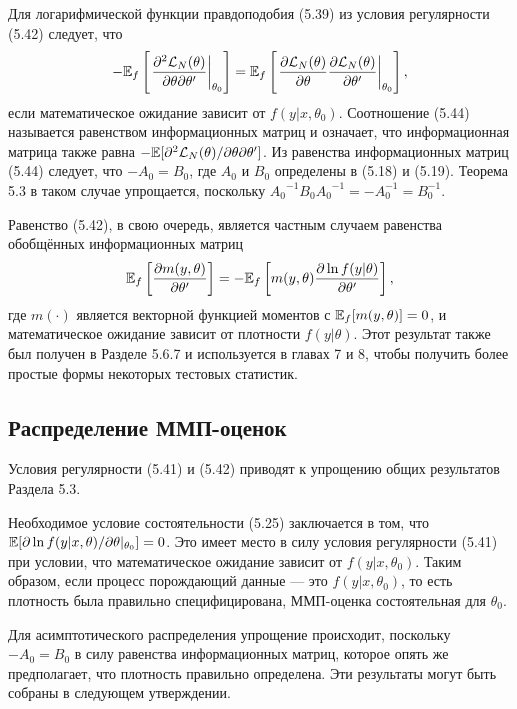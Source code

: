 Для логарифмической функции правдоподобия (5.39) из условия регулярности (5.42) следует, что
\begin{equation}
-\mathbb{E}_{f} \left[ \left. \frac{\partial^2 \mathcal{L}_{N}(\theta)}{\partial \theta \partial \theta'} \right|_{\theta_0} \right] = \mathbb{E}_{f} \left[ \left. \frac{\partial \mathcal{L}_{N}(\theta)}{\partial \theta} \frac{\partial \mathcal{L}_{N}(\theta)}{\partial \theta'} \right|_{\theta_0} \right],
\end{equation}
если математическое ожидание зависит от $f(y|x,\theta_0)$. Соотношение (5.44) называется равенством информационных матриц и означает, что информационная матрица также равна $-\mathbb{E} [\partial^2 \mathcal{L}_{N}(\theta) / \partial \theta \partial \theta']$. Из равенства информационных матриц (5.44) следует, что $-A_0=B_0$, где $A_0$ и $B_0$ определены в (5.18) и (5.19). Теорема 5.3 в таком случае упрощается, поскольку ${A_0}^{-1}B_0{A_0}^{-1}=-A_0^{-1}=B_0^{-1}$. 

Равенство (5.42), в свою очередь, является частным случаем равенства обобщённых информационных матриц
\begin{equation}
\mathbb{E}_{f} \left[ \frac{\partial m(y,\theta)}{\partial \theta'} \right] = -\mathbb{E}_{f} \left[ m(y,\theta) \frac{\partial \ln  f(y|\theta)}{ \partial \theta'} \right],
\end{equation}
где $m(\cdot)$ является векторной функцией моментов с $\mathbb{E}_{f}[m(y,\theta)]=0$, и математическое ожидание зависит от плотности  $f(y|\theta)$. Этот результат также был получен в Разделе 5.6.7 и используется в главах 7 и 8, чтобы получить более простые формы некоторых тестовых статистик.

\subsection{Распределение ММП-оценок}

Условия регулярности (5.41) и (5.42) приводят к упрощению общих результатов Раздела 5.3.

Необходимое условие состоятельности (5.25) заключается в том, что $\mathbb{E}[\partial \ln f(y|x,\theta) / \partial \theta|_{\theta_0}] = 0$. Это имеет место в силу условия регулярности (5.41) при условии, что математическое ожидание зависит от $f(y|x,\theta_0)$. Таким образом, если процесс порождающий данные --- это $f(y|x,\theta_0)$, то есть плотность была правильно специфицирована, ММП-оценка состоятельная для $\theta_0$.

Для асимптотического распределения упрощение происходит, поскольку $-A_0=B_0$ в силу равенства информационных матриц, которое опять же предполагает, что плотность правильно определена. Эти результаты могут быть собраны в следующем утверждении.

